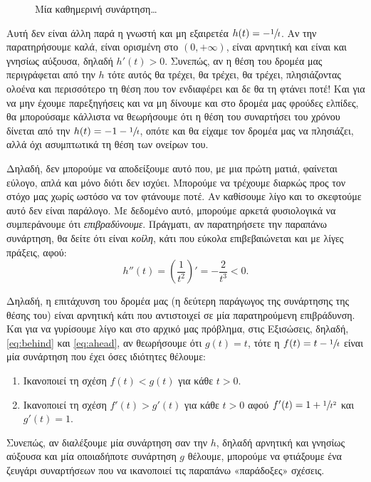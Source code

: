 \documentclass[11pt,a4paper]{article}
\newcommand{\pn}[1]{{\left(#1\right)}}
\theoremstyle{definition}
\begin{document}
	\begin{figure}[!htb]
		\centering
		\caption{Μία καθημερινή συνάρτηση\ldots}
		\label{fig:1}
	\end{figure}

	Αυτή δεν είναι άλλη παρά η γνωστή και μη εξαιρετέα $h(t)=-\sfrac{1}{t}$. Αν την παρατηρήσουμε καλά, είναι ορισμένη στο $(0,+\infty)$, είναι αρνητική και είναι και γνησίως αύξουσα, δηλαδή $h'(t)>0$. Συνεπώς, αν η θέση του δρομέα μας περιγράφεται από την $h$ τότε αυτός θα τρέχει, θα τρέχει, θα τρέχει, πλησιάζοντας ολοένα και περισσότερο τη θέση που τον ενδιαφέρει και δε θα τη φτάνει ποτέ! Και για να μην έχουμε παρεξηγήσεις και να μη δίνουμε και στο δρομέα μας φρούδες ελπίδες, θα μπορούσαμε κάλλιστα να θεωρήσουμε ότι η θέση του συναρτήσει του χρόνου δίνεται από την $h(t)=-1-\sfrac{1}{t}$, οπότε και θα είχαμε τον δρομέα μας να πλησιάζει, αλλά όχι ασυμπτωτικά τη θέση των ονείρων του.
	
	Δηλαδή, δεν μπορούμε να αποδείξουμε αυτό που, με μια πρώτη ματιά, φαίνεται εύλογο, απλά και μόνο διότι δεν ισχύει. Μπορούμε να τρέχουμε διαρκώς προς τον στόχο μας χωρίς ωστόσο να τον φτάνουμε ποτέ. Αν καθίσουμε λίγο και το σκεφτούμε αυτό δεν είναι παράλογο. Με δεδομένο αυτό, μπορούμε αρκετά φυσιολογικά να συμπεράνουμε ότι \textit{επιβραδύνουμε}. Πράγματι, αν παρατηρήσετε την παραπάνω συνάρτηση, θα δείτε ότι είναι \textit{κοίλη}, κάτι που εύκολα επιβεβαιώνεται και με λίγες πράξεις, αφού:
	\[h''(t)=\pn{\frac{1}{t^2}}'=-\frac{2}{t^3}<0.\]
	
	Δηλαδή, η επιτάχυνση του δρομέα μας (η δεύτερη παράγωγος της συνάρτησης της θέσης του) είναι αρνητική κάτι που αντιστοιχεί σε μία παρατηρούμενη επιβράδυνση. Και για να γυρίσουμε λίγο και στο αρχικό μας πρόβλημα, στις Εξισώσεις, δηλαδή, \eqref{eq:behind} και \eqref{eq:ahead}, αν θεωρήσουμε ότι $g(t)=t$, τότε η $f(t)=t-\sfrac{1}{t}$ είναι μία συνάρτηση που έχει όσες ιδιότητες θέλουμε:
	\begin{enumerate}
		\item Ικανοποιεί τη σχέση $f(t)<g(t)$ για κάθε $t>0$.
		\item Ικανοποιεί τη σχέση $f'(t)>g'(t)$ για κάθε $t>0$ αφού $f'(t)=1+\sfrac{1}{t^2}$ και $g'(t)=1$.
	\end{enumerate}
	Συνεπώς, αν διαλέξουμε μία συνάρτηση σαν την $h$, δηλαδή αρνητική και γνησίως αύξουσα και μία οποιαδήποτε συνάρτηση $g$ θέλουμε, μπορούμε να φτιάξουμε ένα ζευγάρι συναρτήσεων που να ικανοποιεί τις παραπάνω «παράδοξες» σχέσεις.
	
\end{document}
